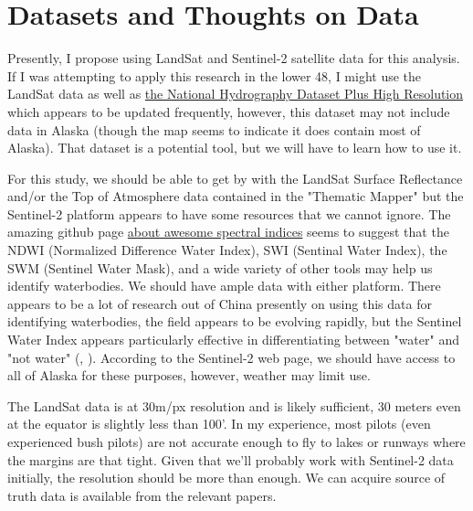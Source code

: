 \documentclass[
    ngerman,american
    ]{scrartcl}
\renewcommand{\cite}[1]{ (\citeauthor{#1}, \citeyear{#1})}
\begin{document}

            \section{Datasets and Thoughts on Data}

                Presently, I propose using LandSat and Sentinel-2 satellite data for this analysis.  If I was attempting to apply this research in the lower 48, I might use the LandSat data as well as  \href{https://www.arcgis.com/home/item.html?id=f1f45a3ba37a4f03a5f48d7454e4b654}{the National Hydrography Dataset Plus High Resolution} which appears to be updated frequently, however, this dataset may not include data in Alaska (though the map seems to indicate it does contain most of Alaska).  That dataset is a potential tool, but we will have to learn how to use it.
                
                For this study, we should be able to get by with the LandSat Surface Reflectance and/or the Top of Atmosphere data contained in the "Thematic Mapper" but the Sentinel-2 platform appears to have some resources that we cannot ignore.  The amazing github page \href{https://github.com/awesome-spectral-indices/awesome-spectral-indices}{about awesome spectral indices} seems to suggest that the NDWI (Normalized Difference Water Index), SWI (Sentinal Water Index), the SWM (Sentinel Water Mask), and a wide variety of other tools may help us identify waterbodies.  We should have ample data with either platform.  There appears to be a lot of research out of China presently on using this data for identifying waterbodies, the field appears to be evolving rapidly, but the Sentinel Water Index appears particularly effective in differentiating between "water" and "not water" \cite{jiang2021effective}.  According to the Sentinel-2 web page, we should have access to all of Alaska for these purposes, however, weather may limit use.
                
                The LandSat data is at 30m/px resolution and is likely sufficient, 30 meters even at the equator is slightly less than 100'.  In my experience, most pilots (even experienced bush pilots) are not accurate enough to fly to lakes or runways where the margins are that tight.  Given that we'll probably work with Sentinel-2 data initially, the resolution should be more than enough.  We can acquire source of truth data is available from the relevant papers.
\end{document}
